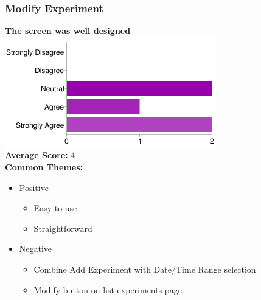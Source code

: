 \subsubsection{Modify Experiment}
\textbf{The screen was well designed}\\
\includegraphics[page=1,scale=0.65]{../other/usability-report-charts/modify_experiment_bar_chart}\\
\textbf{Average Score:} 4\\
\textbf{Common Themes:}
\begin{itemize}
\item Positive
\begin{itemize}
\item Easy to use
\item Straightforward
\end{itemize}
\item Negative
\begin{itemize}
\item Combine Add Experiment with Date/Time Range selection
\item Modify button on list experiments page
\end{itemize}
\end{itemize}

